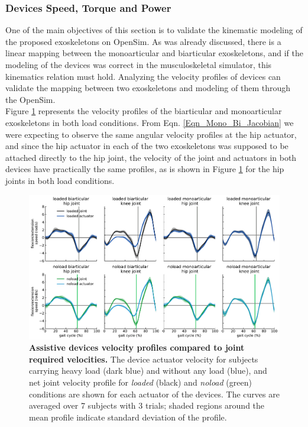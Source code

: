 \documentclass[10pt,letterpaper]{article}
\begin{document}
\subsubsection*{Devices Speed, Torque and Power}
One of the main objectives of this section is to validate the kinematic modeling of the proposed exoskeletons on OpenSim. As was already discussed, there is a linear mapping between the monoarticular and biarticular exoskeletons, and if the modeling of the devices was correct in the musculoskeletal simulator, this kinematics relation must hold. Analyzing the velocity profiles of devices can validate the mapping between two exoskeletons and modeling of them through the OpenSim.\\
Figure \ref{Fig_IdealExo_Speed} represents the velocity profiles of the biarticular and monoarticular exoskeletons in both load conditions. From  Eqn. \eqref{Eqn_Mono_Bi_Jacobian} we were expecting to observe the same angular velocity profiles at the hip actuator, and since the hip actuator in each of the two exoskeletons was supposed to be attached directly to the hip joint, the velocity of the joint and actuators in both devices have practically the same profiles, as is shown in Figure \ref{Fig_IdealExo_Speed}  for the hip joints in both load conditions.\\
\begin{figure}[ht]   
	\centering
	\includegraphics[width=\linewidth]{Ideal_Exo_MonovsBi_Figures/PaperFigure_Exoskeletons_Speed.pdf}
	\vspace{1mm}
	\caption{{\small\textbf{Assistive devices velocity profiles compared to joint required velocities.} The device actuator velocity for subjects carrying heavy load (dark blue) and without any load (blue), and net joint velocity profile for \textit{loaded} (black) and \textit{noload} (green) conditions are shown for each actuator of the devices. The curves are averaged over 7 subjects with 3 trials; shaded regions around the mean profile indicate standard deviation of the profile.}}
	\label{Fig_IdealExo_Speed}
\end{figure}
\end{document}
